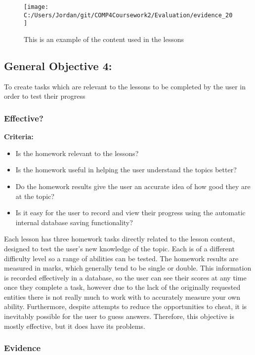 \begin{figure}[H]
	\texttt{[image: C:/Users/Jordan/git/COMP4Coursework2/Evaluation/evidence\_20]}
	\caption{This is an example of the content used in the lessons}
\end{figure}

\subsection{General Objective 4: }

To create tasks which are relevant to the lessons to be completed by the user in order to test their progress

\subsubsection{Effective?}

\textbf{Criteria: }

\begin{itemize}
	\item Is the homework relevant to the lessons?
	\item Is the homework useful in helping the user understand the topics better?
	\item Do the homework results give the user an accurate idea of how good they are at the topic?
	\item Is it easy for the user to record and view their progress using the automatic internal database saving functionality?
\end{itemize}

Each lesson has three homework tasks directly related to the lesson content, designed to test the user's new knowledge of the topic. Each is of a different difficulty level so a range of abilities can be tested. The homework results are measured in marks, which generally tend to be single or double. This information is recorded effectively in a database, so the user can see their scores at any time once they complete a task, however due to the lack of the originally requested entities there is not really much to work with to accurately measure your own ability. Furthermore, despite attempts to reduce the opportunities to cheat, it is inevitably possible for the user to guess answers. Therefore, this objective is mostly effective, but it does have its problems.

\subsubsection{Evidence}

